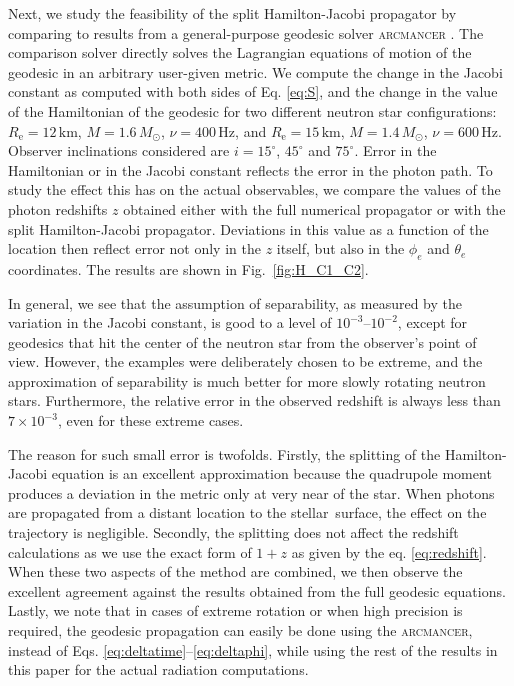 \documentclass{aa}
\newcommand{\refe}[1]{#1}
\newcommand{\refedel}[1]{}
\newcommand{\Msun}{\ensuremath{M_{\odot}}}
\begin{document}
Next, we study the feasibility of the split Hamilton-Jacobi propagator by comparing to results from a general-purpose geodesic solver \textsc{arcmancer} \citep{PRJ16}.
The comparison solver directly solves the Lagrangian equations of motion of the geodesic in an arbitrary user-given metric. 
We compute the change in the Jacobi constant as computed with both sides of Eq. \eqref{eq:S}, and the change in the value of the Hamiltonian of the geodesic for two different neutron star configurations:
$R_{\mathrm{e}}=12\,\mathrm{km}$, $M=1.6\,\Msun$, $\nu=400\,\mathrm{Hz}$, and $R_{\mathrm{e}}=15\,\mathrm{km}$, $M=1.4\,\Msun$, $\nu=600\,\mathrm{Hz}$.
Observer inclinations considered are $i=15^\circ$, $45^\circ$ and $75^\circ$.
Error in the Hamiltonian or in the Jacobi constant reflects the error in the photon path.
To study the effect this has on the actual observables, we compare the values of the photon redshifts $z$ obtained either with the full numerical propagator or with the split Hamilton-Jacobi propagator.
Deviations in this value as a function of the location then reflect error not only in the $z$ itself, but also in the $\phi_e$ and $\theta_e$ coordinates.
The results are shown in Fig.~\ref{fig:H_C1_C2}. 

In general, we see that the assumption of separability, as measured by the variation in the Jacobi constant, is good to a level of $10^{-3}$--$10^{-2}$, except for geodesics that hit the center of the neutron star from the observer's point of view. 
However, the examples were deliberately chosen to be extreme, and the approximation of separability is much better for more slowly rotating neutron stars.
Furthermore, the relative error in the observed redshift is always less than $7 \times 10^{-3}$, even for these extreme cases.

The reason for such small error is twofolds.
Firstly, the splitting of the Hamilton-Jacobi equation is an excellent \refe{approximation} because the quadrupole moment produces a deviation \refe{in} the metric only at very \refe{near} of the star.
When photons are propagated from a distant location to the \refe{stellar} surface, the effect on the \refedel{exact} trajectory is negligible.
Secondly, the splitting does not affect the redshift calculations as we use the exact form of $1+z$ as given by the eq. \eqref{eq:redshift}.
When these two aspects of the method are combined, we then observe the excellent agreement against the results obtained from the full geodesic equations.
Lastly, we note that in cases of extreme rotation or when high precision is required, the geodesic propagation can easily be done using the \textsc{arcmancer}, instead of Eqs. \eqref{eq:deltatime}--\eqref{eq:deltaphi}, while using the rest of the results in this paper for the actual radiation computations.
\end{document}
